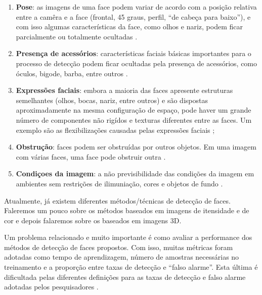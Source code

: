 	\begin{enumerate}
		\item \textbf{Pose}: as imagens de uma face podem variar de acordo com a posição relativa entre a camêra e a face (frontal, 45 graus, perfil, ``de cabeça para baixo''), e com isso algumas características da face, como olhos e nariz, podem ficar parcialmente ou totalmente ocultadas \cite{yang}.
		\item \textbf{Presença de acessórios}: características faciais básicas importantes para o processo de detecção podem ficar ocultadas pela presença de acessórios, como óculos, bigode, barba, entre outros \cite{oliveira, yang}. 
		\item \textbf{Expressões faciais}: embora a maioria das faces apresente estruturas semelhantes (olhos, bocas, nariz, entre outros) e são dispostas aproximadamente na mesma configuração de espaço, pode haver um grande número de componentes não rigídos e texturas diferentes entre as faces. Um exemplo são as flexibilizações causadas pelas expressões faciais \cite{oliveira, yang};
		\item \textbf{Obstrução}: faces podem ser obstruídas por outros objetos. Em uma imagem com várias faces, uma face pode obstruir outra \cite{yang}.
		\item \textbf{Condiçoes da imagem}: a não previsibilidade das condições da imagem em ambientes sem restrições de ilimuniação, cores e objetos de fundo \cite{oliveira, yang}.
	\end{enumerate}

Atualmente, já existem diferentes métodos/técnicas de detecção de faces. Faleremos um pouco sobre os métodos baseados em imagens de itensidade e de cor e depois falaremos sobre os baseados em imagens 3D.

Um problema relacionado e muito importante é como avaliar a performance dos métodos de detecção de faces propostos. Com isso, muitas métricas foram adotadas como tempo de aprendizagem, número de amostras necessárias no treinamento e a proporção entre taxas de detecção e ``falso alarme''. Esta última é dificultada pelas diferentes definições para as taxas de detecção e falso alarme adotadas pelos pesquisadores \cite{yang}.


